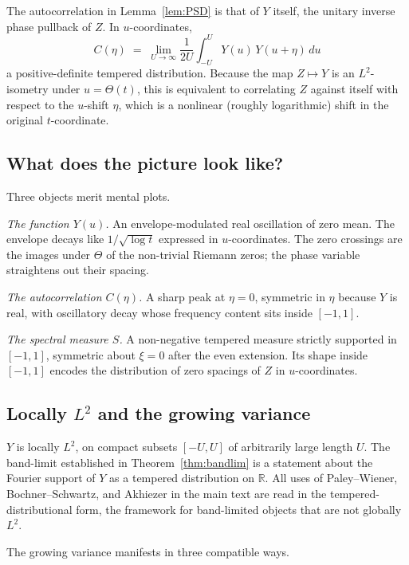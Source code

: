 \documentclass[11pt]{article}
\begin{document}
The autocorrelation in Lemma~\ref{lem:PSD} is that of $Y$ itself, the unitary inverse phase pullback of $Z$. In $u$-coordinates,
\begin{equation}\label{eq:Cetadef}
C(\eta) \;=\; \lim_{U\to\infty}\frac{1}{2U}\int_{-U}^{U}Y(u)\,Y(u+\eta)\,du
\end{equation}
a positive-definite tempered distribution. Because the map $Z\mapsto Y$ is an $L^2$-isometry under $u=\Theta(t)$, this is equivalent to correlating $Z$ against itself with respect to the $u$-shift $\eta$, which is a nonlinear (roughly logarithmic) shift in the original $t$-coordinate.

\subsection{What does the picture look like?}\label{app:picture}

Three objects merit mental plots.

\emph{The function $Y(u)$.} An envelope-modulated real oscillation of zero mean. The envelope decays like $1/\sqrt{\log t}$ expressed in $u$-coordinates. The zero crossings are the images under $\Theta$ of the non-trivial Riemann zeros; the phase variable straightens out their spacing.

\emph{The autocorrelation $C(\eta)$.} A sharp peak at $\eta=0$, symmetric in $\eta$ because $Y$ is real, with oscillatory decay whose frequency content sits inside $[-1,1]$.

\emph{The spectral measure $S$.} A non-negative tempered measure strictly supported in $[-1,1]$, symmetric about $\xi=0$ after the even extension. Its shape inside $[-1,1]$ encodes the distribution of zero spacings of $Z$ in $u$-coordinates.

\subsection{Locally $L^2$ and the growing variance}\label{app:localL2}

$Y$ is locally $L^2$, on compact subsets $[-U,U]$ of arbitrarily large length $U$. The band-limit established in Theorem~\ref{thm:bandlim} is a statement about the Fourier support of $Y$ as a tempered distribution on $\mathbb{R}$. All uses of Paley--Wiener, Bochner--Schwartz, and Akhiezer in the main text are read in the tempered-distributional form, the framework for band-limited objects that are not globally $L^2$.

The growing variance manifests in three compatible ways.
\end{document}

